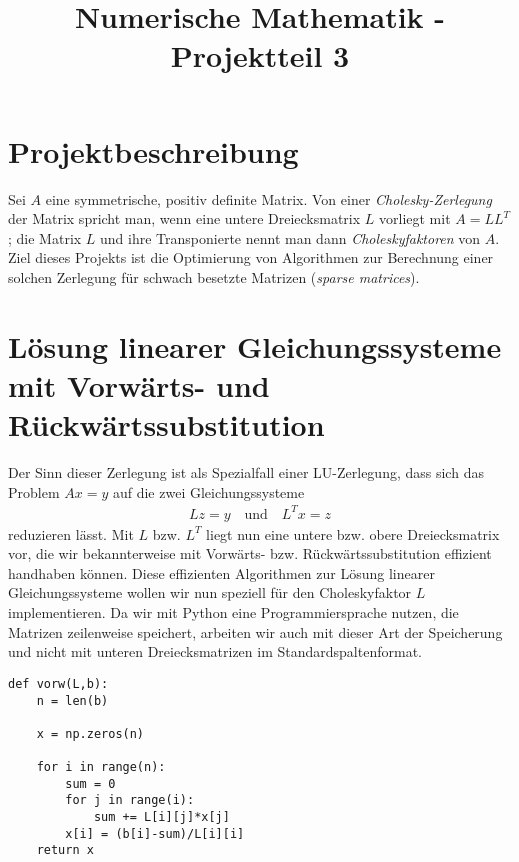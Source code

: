 \documentclass{article}
\title{Numerische Mathematik - Projektteil 3}
\date{\vspace{-5ex}}
\begin{document}
\maketitle

\tableofcontents{}
\newpage

\section{Projektbeschreibung}

Sei $A$ eine symmetrische, positiv definite Matrix. Von einer \textit{Cholesky-Zerlegung} der Matrix spricht man, wenn eine untere Dreiecksmatrix 
$L$ vorliegt mit $A = LL^{T}$; die Matrix $L$ und ihre Transponierte nennt man dann \textit{Choleskyfaktoren} von $A$. Ziel dieses Projekts ist die Optimierung von Algorithmen zur Berechnung einer solchen Zerlegung für schwach besetzte Matrizen (\textit{sparse matrices}).
\newline

\section{Lösung linearer Gleichungssysteme mit Vorwärts- und Rückwärtssubstitution}

Der Sinn dieser Zerlegung ist als Spezialfall einer LU-Zerlegung, dass sich das Problem $Ax=y$ auf die zwei Gleichungssysteme
\begin{align*}
    Lz = y \text{~~~und~~~} L^{T}x=z
\end{align*}
reduzieren lässt. Mit $L$ bzw. $L^{T}$ liegt nun eine untere bzw. obere Dreiecksmatrix vor, die wir bekannterweise mit Vorwärts- bzw. Rückwärtssubstitution effizient handhaben können.
Diese effizienten Algorithmen zur Lösung linearer Gleichungssysteme wollen wir nun speziell für den Choleskyfaktor $L$ implementieren. Da wir mit Python eine Programmiersprache nutzen, die Matrizen zeilenweise speichert, arbeiten wir auch mit dieser Art der Speicherung und nicht mit unteren Dreiecksmatrizen im Standardspaltenformat.

\lstset{language=Python}
\lstset{frame=lines}
\lstset{basicstyle=\footnotesize}
\begin{lstlisting}
def vorw(L,b):
    n = len(b)

    x = np.zeros(n)

    for i in range(n):
        sum = 0
        for j in range(i):
            sum += L[i][j]*x[j]
        x[i] = (b[i]-sum)/L[i][i]
    return x
\end{lstlisting}
\end{document}
